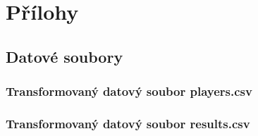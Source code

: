 \documentclass[11pt,a4paper]{report}
\let\openright=\clearpage
\begin{document}


\setcounter{tocdepth}{2}
\tableofcontents







\pagestyle{fancy}








\openright
{}
{}
\listoffigures

\clearpage
{}
{}
\listoftables



\part{Přílohy}
\appendix
\chapter{Datové soubory}


\section{Transformovaný datový soubor players.csv}


\section{Transformovaný datový soubor results.csv}

\end{document}

